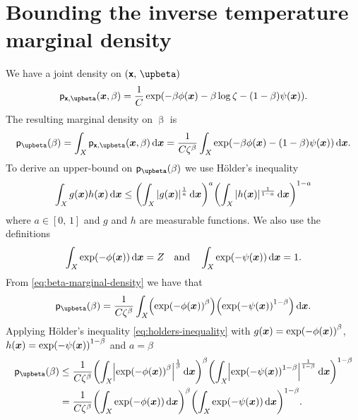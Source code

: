 \section{Bounding the inverse temperature marginal density}

We have a joint density on $(\rvct{x},\,\upbeta)$
\begin{equation}
\pden{\rvct{x},\upbeta}(\vct{x},\beta) =
\frac{1}{C} \exp\lpa -\beta\phi(\vct{x}) -\beta\log\zeta -(1-\beta)\psi(\vct{x})\rpa.
\label{eq:x-beta-joint-density-app}
\end{equation}
The resulting marginal density on $\upbeta$ is
\begin{equation}\label{eq:beta-marginal-density}
\pden{\upbeta}(\beta) = \int_{\set{X}} \pden{\rvct{x},\upbeta}(\vct{x},\beta) \,\dr\vct{x}
= \frac{1}{C\zeta^\beta} \int_{\set{X}} \exp\lpa -\beta\phi(\vct{x}) -(1-\beta)\psi(\vct{x})\rpa\,\dr\vct{x}.
\end{equation}
To derive an upper-bound on $\pden{\upbeta}(\beta)$ we use H\"older's inequality
\begin{equation}\label{eq:holders-inequality}
  \int_{\set{X}} g(\vct{x}) h(\vct{x}) \,\dr\vct{x} \leq 
  \lpa \int_{\set{X}} |g(\vct{x})|^{\frac{1}{a}} \,\dr\vct{x} \rpa^{a}
  \lpa \int_{\set{X}} |h(\vct{x})|^{\frac{1}{1-a}} \,\dr\vct{x} \rpa^{1-a}
\end{equation}
where $a \in [0,\,1]$ and $g$ and $h$ are measurable functions. We also use the definitions 
\begin{equation}\label{eq:target-and-based-norm-consts}
  \int_\set{X} \exp\lpa-\phi(\vct{x})\rpa\,\dr\vct{x} = Z
  \quad\text{and}\quad
  \int_\set{X} \exp\lpa-\psi(\vct{x})\rpa\,\dr\vct{x} = 1.
\end{equation}
From \eqref{eq:beta-marginal-density} we have that
\begin{equation}
  \pden{\upbeta}(\beta)
  =
  \frac{1}{C\zeta^{\beta}} 
  \int_\set{X} 
    \lpa \exp\lpa-\phi(\vct{x}) \rpa^{\beta}\rpa \lpa \exp\lpa-\psi(\vct{x})\rpa^{1 - \beta}\rpa
  \,\dr\vct{x}.
\end{equation}
Applying H\"older's inequality \eqref{eq:holders-inequality} with $g(\vct{x}) = \exp\lpa-\phi(\vct{x})\rpa^{\beta}$, $h(\vct{x}) = \exp\lpa-\psi(\vct{x})\rpa^{1-\beta}$ and $a = \beta$
\begin{align}
  \pden{\upbeta}(\beta)
  &\leq
  \frac{1}{C\zeta^{\beta}} 
  \lpa
  \int_\set{X} 
    \left| \exp\lpa-\phi(\vct{x}) \rpa^{\beta} \right|^{\frac{1}{\beta}}
  \,\dr\vct{x}
  \rpa^{\beta}
  \lpa
  \int_\set{X} 
    \left|\exp\lpa-\psi(\vct{x})\rpa^{1 - \beta}\right|^{\frac{1}{1-\beta}}
  \,\dr\vct{x}
  \rpa^{1-\beta}  
  \\
  &=
  \frac{1}{C\zeta^{\beta}} 
  \lpa
  \int_\set{X} 
    \exp\lpa-\phi(\vct{x})\rpa
  \,\dr\vct{x}
  \rpa^{\beta}
  \lpa
  \int_\set{X} 
    \exp\lpa-\psi(\vct{x})\rpa
  \,\dr\vct{x}
  \rpa^{1-\beta}.
\end{align}
